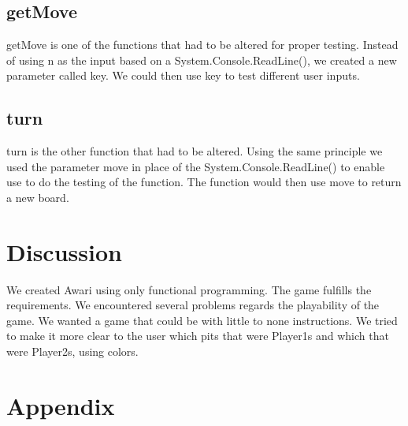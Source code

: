 \documentclass[a4paper]{report}
\begin{document}
\subsection*{getMove}
getMove is one of the functions that had to be altered for proper testing. Instead of using n as the input based on a System.Console.ReadLine(), we created a new parameter called key.
We could then use key to test different user inputs.


\subsection*{turn}
turn is the other function that had to be altered. Using the same principle we used the parameter move in place of the System.Console.ReadLine() to enable use to do the testing of the function. The function would then use move
to return a new board.


\section*{Discussion}
We created Awari using only functional programming. The game fulfills the requirements. We encountered several problems regards the playability of the game. We wanted a game that could be with little to none
instructions. We tried to make it more clear to the user which pits that were Player1s and which that were Player2s, using colors.
\section*{Appendix}
\lstset{language=FSharp}

\end{document}
